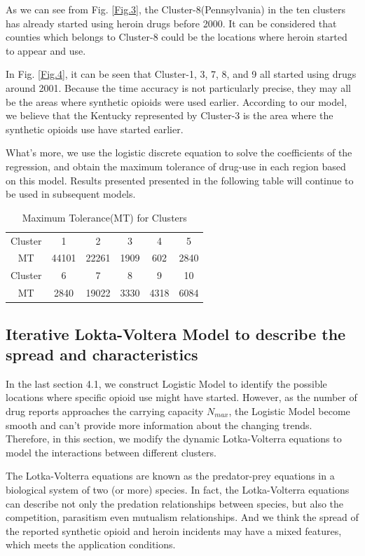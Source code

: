 \documentclass[12pt]{article}
\begin{document}
As we can see from Fig. \ref{Fig.3}, the Cluster-8(Pennsylvania) in the ten clusters has already started using heroin drugs before 2000. It can be considered that counties which belongs to Cluster-8 could be the locations where heroin started to appear and use.

In Fig. \ref{Fig.4}, it can be seen that Cluster-1, 3, 7, 8, and 9 all started using drugs around 2001. Because the time accuracy is not particularly precise, they may all be the areas where synthetic opioids were used earlier. According to our model, we believe that the Kentucky represented by Cluster-3 is the area where the synthetic opioids use have started earlier.

What’s more, we use the logistic discrete equation to solve the coefficients of the regression, and obtain the maximum tolerance of drug-use in each region based on this model. Results presented presented in the following table will continue to be used in subsequent models.
\begin{table}[H]
	\centering
	\caption{Maximum Tolerance(MT) for Clusters}
	\begin{tabular}
	{cccccc}
	\toprule[1pt]
	Cluster	& 1 & 2 & 3 & 4 &5 \\
	MT	& 44101 & 22261 & 1909 & 602 & 2840\\
	\midrule
	Cluster	& 6 & 7 &  8 & 9 & 10 \\
	MT & 2840 & 19022 & 3330 & 4318 & 6084\\
	\bottomrule[1pt]
	\end{tabular}
\end{table}

\subsection{Iterative Lokta-Voltera Model to describe the spread and characteristics}
In the last section 4.1, we construct Logistic Model to identify the possible locations where specific opioid use might have started. However, as the number of drug reports approaches the carrying capacity $N_{max}$, the Logistic Model become smooth and can’t provide more information about the changing trends. Therefore, in this section, we modify the dynamic Lotka-Volterra equations to model the interactions between different clusters.
	
The Lotka-Volterra equations are known as the predator-prey equations in a biological system of two (or more) species. In fact, the Lotka-Volterra equations can describe not only the predation relationships between species, but also the competition, parasitism even mutualism relationships. And we think the spread of the reported synthetic opioid and heroin incidents may have a mixed features, which meets the application conditions.
\end{document}
